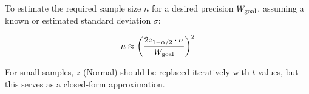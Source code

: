 To estimate the required sample size $n$ for a desired precision $W_{\rm goal}$, assuming a known or estimated standard deviation $\sigma$:

$$ n \approx \left( \frac{2 z_{1-\alpha/2} \cdot \sigma}{W_{\rm goal}} \right)^2 $$

For small samples, $z$ (Normal) should be replaced iteratively with $t$ values, but this serves as a closed-form approximation.



